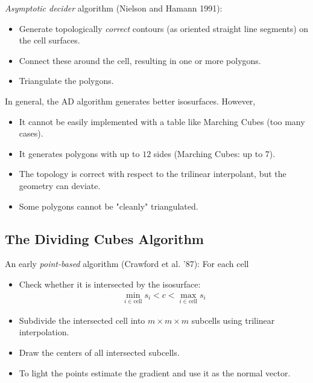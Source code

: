 \emph{Asymptotic decider} algorithm (Nielson and Hamann 1991):
\begin{itemize}
    \item Generate topologically \emph{correct} contours (as oriented straight line segments) on the cell surfaces.
    \item Connect these around the cell, resulting in one or more polygons.
    \item Triangulate the polygons.
\end{itemize}
In general, the AD algorithm generates better isosurfaces. However,
\begin{itemize}
    \item It cannot be easily implemented with a table like Marching Cubes (too many cases).
    \item It generates polygons with up to $12$ sides (Marching Cubes: up to 7).
    \item The topology is correct with respect to the trilinear interpolant, but the geometry can deviate.
    \item Some polygons cannot be "cleanly" triangulated.
\end{itemize}

\subsection{The Dividing Cubes Algorithm}
An early \emph{point-based} algorithm (Crawford et al. '87): For each cell
\begin{itemize}
    \item Check whether it is intersected by the isosurface:
        \begin{align*}
            \min_{i\in \text{cell}} s_i < c < \max_{i\in \text{cell}} s_i
        \end{align*}
    \item Subdivide the intersected cell into $m\times m\times m$ subcells using trilinear interpolation.
    \item Draw the centers of all intersected subcells.
    \item To light the points estimate the gradient and use it as the normal vector.
\end{itemize}

